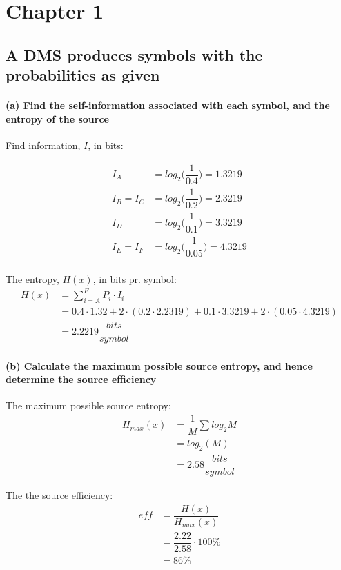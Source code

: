 \documentclass[Main]{subfiles}
\begin{document}
\section{Chapter 1}

\subsection{A DMS produces symbols with the probabilities as given}

\paragraph{(a)  Find the self-information associated with each symbol, and the entropy of
the source}
Find information, $I$, in bits:

\begin{align}
I_A &= log_2\bigg(\dfrac{1}{0.4}\bigg) = 1.3219 \\
I_B = I_C &= log_2\bigg(\dfrac{1}{0.2}\bigg) = 2.3219\\
I_D &= log_2\bigg(\dfrac{1}{0.1}\bigg) = 3.3219\\
I_E = I_F &= log_2\bigg(\dfrac{1}{0.05}\bigg) = 4.3219\\
\end{align}

The entropy, $H(x)$, in bits pr. symbol:
\begin{align}
H(x) &= \sum_{i = A}^F P_i \cdot I_i \\
	&= 0.4\cdot 1.32 + 2\cdot (0.2 \cdot 2.2319) + 0.1 \cdot 3.3219 + 2 \cdot(0.05\cdot 4.3219) \\
	&= 2.2219 \dfrac{bits}{symbol}
\end{align}

\paragraph{(b) Calculate the maximum possible source entropy, and hence determine the
source efficiency}

The maximum possible source entropy:
\begin{align}
H_{max}(x) &= \dfrac{1}{M} \sum log_2 M\\
	&= log_2 (M)\\
	&= 2.58 \dfrac{bits}{symbol}
\end{align}

The the source efficiency:
\begin{align}
eff &= \dfrac{H(x)}{H_{max}(x)} \\
	&= \dfrac{2.22}{2.58} \cdot 100\% \\
	&= 86\%
\end{align}	
\end{document}
